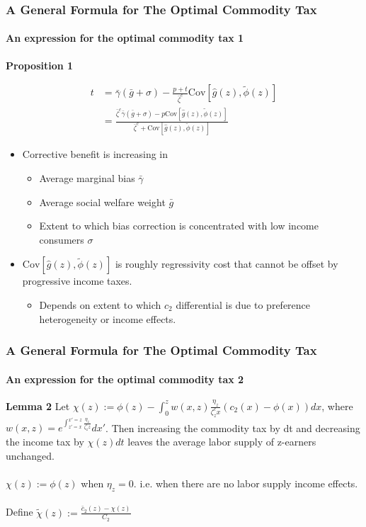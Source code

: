 \documentclass{beamer}
\newcommand{\Cov}{\mathrm{Cov}}
\begin{document}
\begin{frame}
\frametitle{A General Formula for The Optimal Commodity Tax}
\framesubtitle{An expression for the optimal commodity tax 1}

\textbf{Proposition 1} 

\begin{align}
t &= \bar{\gamma}(\bar{g} + \sigma) - \frac{p+t}{\bar{\zeta}^c} \Cov \left[\hat{g}(z), \tilde{\phi}(z) \right] \\
&= \frac{\bar{\zeta}^c \bar{\gamma} (\bar{g}  + \sigma) - p\Cov \left[ \hat{g}(z),\tilde{\phi}(z) \right]}{\bar{\zeta}^c + \Cov \left[\hat{g}(z), \tilde{\phi}(z) \right]}
\end{align}


\begin{itemize}

\item Corrective benefit is increasing in 
	\begin{itemize}
	 \item Average marginal bias $\bar{\gamma}$
	 \item  Average social welfare weight $\bar{g}$
	 \item Extent to which bias correction is concentrated with low income consumers $\sigma$
	\end{itemize}
\item $\Cov \left[ \hat{g}(z), \tilde{\phi}(z) \right]$ is roughly regressivity cost that cannot be offset by progressive income taxes. 
\begin{itemize}
	\item Depends on extent to which $c_2$ differential is due to preference heterogeneity or income effects. 
\end{itemize}
\end{itemize}

\end{frame}




\begin{frame}
\frametitle{A General Formula for The Optimal Commodity Tax}
\framesubtitle{An expression for the optimal commodity tax 2}

\textbf{Lemma 2} Let $\chi(z) := \phi(z) - \int_{0}^{z} w(x,z) \frac{\eta_z}{\zeta_z^c x}(c_2(x) - \phi(x))dx$, where $w(x,z) = e^{\int_{z'=x}^{x'=z}\frac{\eta_z}{\zeta_z^c z}}dx'$. Then increasing the commodity tax by dt and decreasing the income tax by $\chi(z)dt$ leaves the average labor supply of z-earners unchanged. \\~\\ 

$\chi(z) := \phi(z)$ when $\eta_z = 0$. i.e. when there are no labor supply income effects. \\~\\ 

Define $\tilde{\chi}(z) := \frac{\bar{c}_2(z) - \chi(z)}{C_2}$
 
\end{frame}
\end{document}
